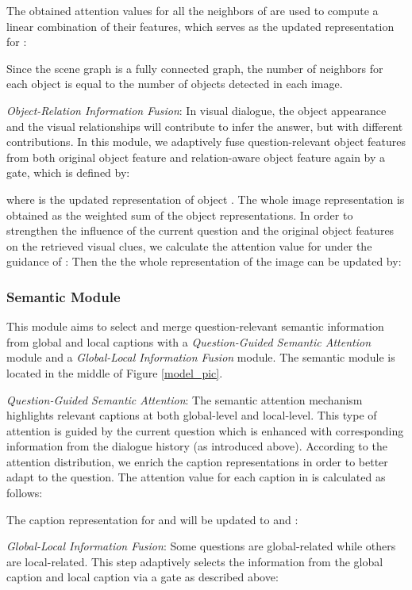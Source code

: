 \documentclass[letterpaper]{article} \usepackage{aaai20}  \usepackage{times}  \usepackage{helvet} \usepackage{courier}  \usepackage[hyphens]{url}  \usepackage{graphicx} \urlstyle{rm} \def\UrlFont{\rm}  \usepackage{graphicx}  \frenchspacing  \setlength{\pdfpagewidth}{8.5in}  \setlength{\pdfpageheight}{11in}  \usepackage{mathrsfs} \usepackage{amsfonts,amssymb}  \usepackage{tabularx} \usepackage{url}
\begin{document}
The obtained attention values for all the neighbors of  are used to compute a linear combination of their features, which serves as the updated representation  for :



Since the scene graph is a fully connected graph, the number of neighbors  for each object is equal to the number of objects detected in each image. 

\textit{Object-Relation Information Fusion}: In visual dialogue, the object appearance and the visual relationships will contribute to infer the answer, but with different contributions. In this module, we adaptively fuse question-relevant object features  from both original object feature  and relation-aware object feature  again by a gate, 
which is defined by:


where  is the updated representation of object . The whole image representation  is obtained as the weighted sum of the object representations.  In order to strengthen the influence of the current question  and the original object features on the retrieved visual clues, we calculate the attention value  for  under the guidance of : 
Then the the whole representation of the image  can be updated by:



\subsubsection{Semantic Module}

This module aims to select and merge question-relevant semantic information from global and local captions with a \textit{Question-Guided Semantic Attention} module and a \textit{Global-Local Information Fusion} module. The semantic module is located in the middle of Figure \ref{model_pic}. 


\textit{Question-Guided Semantic Attention}: The semantic attention mechanism highlights relevant captions at both global-level and local-level. This type of attention is guided by the current question which is enhanced with corresponding information from the dialogue history (as introduced above). According to the attention distribution, we enrich the caption representations in order to better adapt to the question. The attention value for each caption in  is calculated as follows:


The caption representation for  and   will be updated to  and :



\textit{Global-Local Information Fusion}: Some questions are global-related while others are local-related. This step adaptively selects the information from the global caption  and local caption  via a gate as described above:
\end{document}
